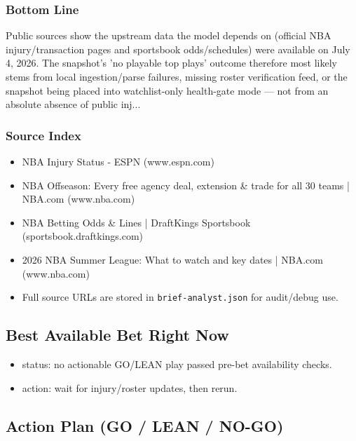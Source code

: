 \documentclass[10pt]{article}
\begin{document}
\subsubsection*{Bottom Line}

Public sources show the upstream data the model depends on (official NBA injury/transaction pages and sportsbook odds/schedules) were available on July 4, 2026. The snapshot’s 'no playable top plays' outcome therefore most likely stems from local ingestion/parse failures, missing roster verification feed, or the snapshot being placed into watchlist-only health-gate mode — not from an absolute absence of public inj...

\subsubsection*{Source Index}

\begin{itemize}
\item [S1] NBA Injury Status - ESPN (www.espn.com)
\item [S2] NBA Offseason: Every free agency deal, extension \& trade for all 30 teams | NBA.com (www.nba.com)
\item [S3] NBA Betting Odds \& Lines | DraftKings Sportsbook (sportsbook.draftkings.com)
\item [S4] 2026 NBA Summer League: What to watch and key dates | NBA.com (www.nba.com)
\item Full source URLs are stored in \texttt{brief-analyst.json} for audit/debug use.
\end{itemize}

\newpage

\subsection*{Best Available Bet Right Now}

\begin{itemize}
\item status: no actionable GO/LEAN play passed pre-bet availability checks.
\item action: wait for injury/roster updates, then rerun.
\end{itemize}

\newpage

\subsection*{Action Plan (GO / LEAN / NO-GO)}
\end{document}
